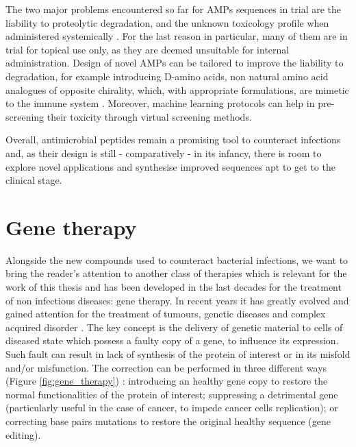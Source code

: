 The two major problems encountered so far for AMPs sequences in trial are the liability to proteolytic degradation, and the unknown toxicology profile when administered systemically \citep{Hancock2006}. For the last reason in particular, many of them are in trial for topical use only, as they are deemed unsuitable for internal administration.
%
Design of novel AMPs can be tailored to improve the liability to degradation, for example introducing D-amino acids, non natural amino acid analogues of opposite chirality, which, with appropriate formulations, are mimetic to the immune system \citep{Wipf2009}. Moreover, machine learning protocols can help in pre-screening their toxicity through virtual screening methods.

Overall, antimicrobial peptides remain a promising tool to counteract infections and, as their design is still - comparatively - in its infancy, there is room to explore novel applications and synthesise improved sequences apt to get to the clinical stage.


\section{Gene therapy} \label{sec:gene_th}
Alongside the new compounds used to counteract bacterial infections, we want to bring the reader's attention to another class of therapies which is relevant for the work of this thesis and has been developed in the last decades for the treatment of non infectious diseases: gene therapy. In recent years it has greatly evolved and gained attention for the treatment of tumours, genetic diseases and complex acquired disorder \citep{Anguela2019}.
%
The key concept is the delivery of genetic material to cells of diseased state which possess a faulty copy of a gene, to influence its expression. Such fault can result in lack of synthesis of the protein of interest or in its misfold and/or misfunction. The correction can be performed in three different ways (Figure \ref{fig:gene_therapy}) \citep{Anguela2019}:
%
introducing an healthy gene copy to restore the normal functionalities of the protein of interest;
%
suppressing a detrimental gene (particularly useful in the case of cancer, to impede cancer cells replication);
%
or correcting base pairs mutations to restore the original healthy sequence (gene editing).

